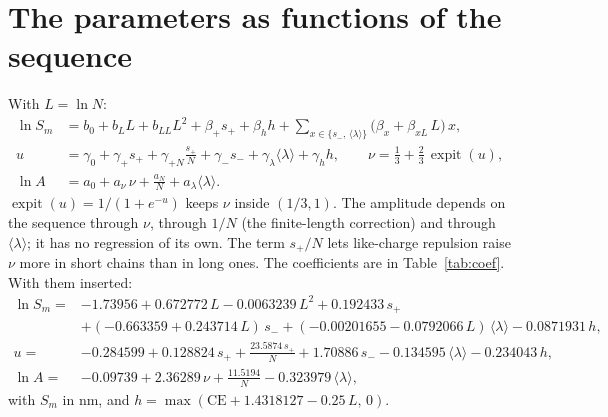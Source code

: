 \documentclass[11pt]{article}
\newcommand{\lam}{\langle\lambda\rangle}
\newcommand{\expit}{\operatorname{expit}}
\begin{document}
\section{The parameters as functions of the sequence}
With $L=\ln N$:
\begin{align}
\ln S_m &= b_0+b_L L+b_{LL}L^2+\beta_+s_++\beta_hh+\sum_{x\in\{s_-,\,\lam\}}\big(\beta_x+\beta_{xL}\,L\big)\,x, \label{eq:Sm}\\
u &= \gamma_0+\gamma_+ s_+ +\gamma_{+N}\frac{s_+}{N}+\gamma_- s_- +\gamma_\lambda\lam+\gamma_h h,\qquad \nu=\frac13+\frac23\,\expit(u),\label{eq:nu}\\
\ln A &= a_0+a_\nu\,\nu+\frac{a_N}{N}+a_\lambda\lam .\label{eq:A}
\end{align}
$\expit(u)=1/(1+e^{-u})$ keeps $\nu$ inside $(1/3,1)$. The amplitude depends on the sequence through $\nu$, through
$1/N$ (the finite-length correction) and through $\lam$; it has no regression of its own. The term $s_+/N$ lets like-charge
repulsion raise $\nu$ more in short chains than in long ones. The coefficients are in Table~\ref{tab:coef}. With them inserted:
\begin{align*}
\ln S_m ={}& -1.73956+0.672772\,L-0.0063239\,L^2+0.192433\,s_+\\
 &+(-0.663359+0.243714\,L)\,s_- +(-0.00201655-0.0792066\,L)\,\lam-0.0871931\,h,\\[2pt]
u ={}& -0.284599+0.128824\,s_+ +\frac{23.5874\,s_+}{N}+1.70886\,s_--0.134595\,\lam-0.234043\,h,\\[2pt]
\ln A ={}& -0.09739+2.36289\,\nu+\frac{11.5194}{N}-0.323979\,\lam ,
\end{align*}
with $S_m$ in nm, and $h=\max(\mathrm{CE}+1.4318127-0.25\,L,\,0)$.
\end{document}
